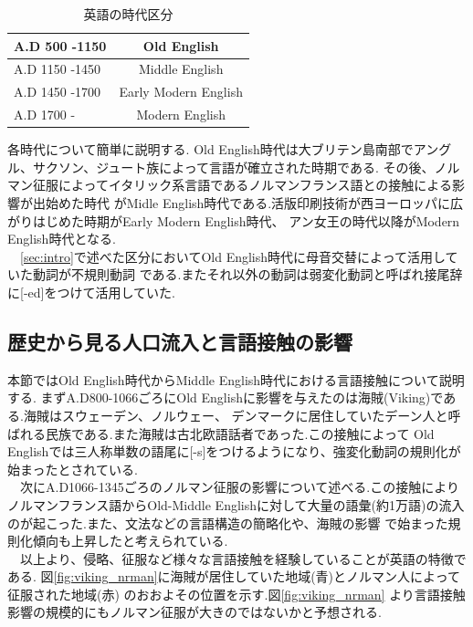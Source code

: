 \documentclass[10.5pt, a4j, twocolumn]{jsarticle}
\begin{document}
{\small
\begin{table}[htbp]
 \centering
 \caption{英語の時代区分\label{tab:eng_div_table}}
 \small
 \begin{tabular}{l|c}
  \hline
  A.D 500 -1150 & Old English \\
  \hline
  A.D 1150 -1450 & Middle English \\
  \hline
  A.D 1450 -1700 & Early Modern English \\
  \hline
  A.D 1700 - & Modern English \\
  \hline
\end{tabular}
\end{table}
}
各時代について簡単に説明する.
Old English時代は大ブリテン島南部でアングル、サクソン、ジュート族によって言語が確立された時期である.
その後、ノルマン征服によってイタリック系言語であるノルマンフランス語との接触による影響が出始めた時代
がMidle English時代である.活版印刷技術が西ヨーロッパに広がりはじめた時期がEarly Modern English時代、
アン女王の時代以降がModern English時代となる.\\
　\ref{sec:intro}で述べた区分においてOld English時代に母音交替によって活用していた動詞が不規則動詞
である.またそれ以外の動詞は弱変化動詞と呼ばれ接尾辞に[-ed]をつけて活用していた.

\subsection{歴史から見る人口流入と言語接触の影響}\label{sec:lang_contact}
本節ではOld English時代からMiddle English時代における言語接触\cite{philip}について説明する.
まずA.D800-1066ごろにOld Englishに影響を与えたのは海賊(Viking)である.海賊はスウェーデン、ノルウェー、
デンマークに居住していたデーン人と呼ばれる民族である.また海賊は古北欧語話者であった.この接触によって
Old Englishでは三人称単数の語尾に[-s]をつけるようになり、強変化動詞の規則化が始まったとされている.\\
　次にA.D1066-1345ごろのノルマン征服の影響について述べる.この接触によりノルマンフランス語からOld-Middle
Englishに対して大量の語彙(約1万語)の流入のが起こった.また、文法などの言語構造の簡略化や、海賊の影響
で始まった規則化傾向も上昇したと考えられている.\\
　以上より、侵略、征服など様々な言語接触を経験していることが英語の特徴である.
図\ref{fig:viking_nrman}に海賊が居住していた地域(青)とノルマン人によって征服された地域(赤)
のおおよその位置を示す.図\ref{fig:viking_nrman}
より言語接触影響の規模的にもノルマン征服が大きのではないかと予想される.
\end{document}
